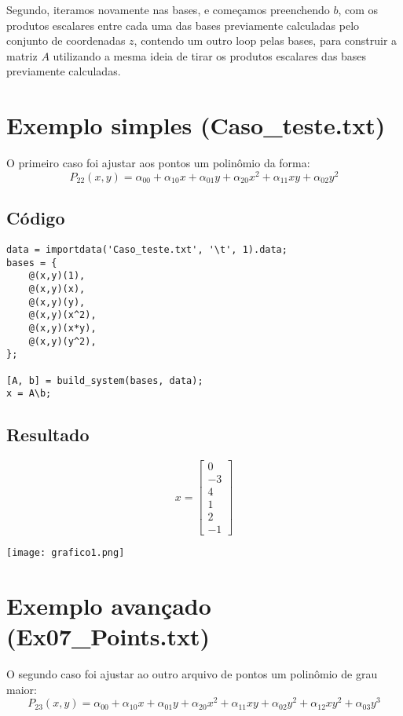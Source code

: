 \documentclass[12pt]{article}
\begin{document}
Segundo, iteramos novamente nas bases, e começamos preenchendo \(b\), com os produtos escalares entre cada uma das bases previamente calculadas pelo conjunto de coordenadas \(z\), contendo um outro loop pelas bases, para construir a matriz \(A\) utilizando a mesma ideia de tirar os produtos escalares das bases previamente calculadas.

\section{Exemplo simples (Caso\_teste.txt)}
O primeiro caso foi ajustar aos pontos um polinômio da forma:
\[
    P_{22}(x,y) = \alpha_{00} + \alpha_{10}x + \alpha_{01}y + \alpha_{20}x^2 + \alpha_{11}xy + \alpha_{02}y^2
\]

\subsection{Código}
\begin{verbatim}
data = importdata('Caso_teste.txt', '\t', 1).data;
bases = {
    @(x,y)(1),
    @(x,y)(x),
    @(x,y)(y),
    @(x,y)(x^2),
    @(x,y)(x*y),
    @(x,y)(y^2),
};

[A, b] = build_system(bases, data);
x = A\b;
\end{verbatim}

\subsection{Resultado}
\[
    x =
    \begin{bmatrix}
        0 \\
        -3 \\
        4 \\
        1 \\
        2 \\
        -1
    \end{bmatrix}
\]
\begin{center}
\texttt{[image: grafico1.png]}
\end{center}

\section{Exemplo avançado (Ex07\_Points.txt)}
O segundo caso foi ajustar ao outro arquivo de pontos um polinômio de grau maior:
\[
    P_{23}(x,y) = \alpha_{00} + \alpha_{10}x + \alpha_{01}y + \alpha_{20}x^2 + \alpha_{11}xy + \alpha_{02}y^2 + \alpha_{12}xy^2 + \alpha_{03}y^3
\]
\end{document}
